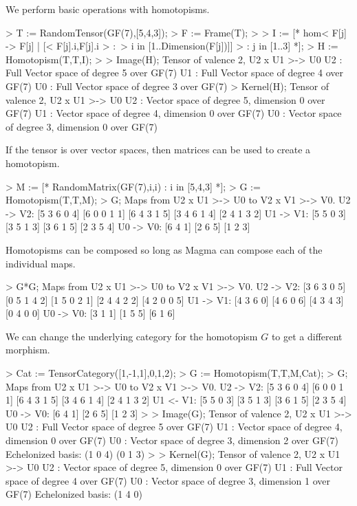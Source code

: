 \begin{example}
We perform basic operations with homotopisms.

\begin{code}
> T := RandomTensor(GF(7),[5,4,3]);
> F := Frame(T);
> 
> I := [* hom< F[j] -> F[j] | [< F[j].i,F[j].i > :\
>   i in [1..Dimension(F[j])]] > : j in [1..3] *];
> H := Homotopism(T,T,I);
> 
> Image(H);
Tensor of valence 2, U2 x U1 >-> U0
U2 : Full Vector space of degree 5 over GF(7)
U1 : Full Vector space of degree 4 over GF(7)
U0 : Full Vector space of degree 3 over GF(7)
> Kernel(H);
Tensor of valence 2, U2 x U1 >-> U0
U2 : Vector space of degree 5, dimension 0 over GF(7)
U1 : Vector space of degree 4, dimension 0 over GF(7)
U0 : Vector space of degree 3, dimension 0 over GF(7)
\end{code}

If the tensor is over vector spaces, then matrices can be used to create a homotopism.

\begin{code}
> M := [* RandomMatrix(GF(7),i,i) : i in [5,4,3] *];
> G := Homotopism(T,T,M);
> G;
Maps from U2 x U1 >-> U0 to V2 x V1 >-> V0.
U2 -> V2: 
[5 3 6 0 4]
[6 0 0 1 1]
[6 4 3 1 5]
[3 4 6 1 4]
[2 4 1 3 2]
U1 -> V1: 
[5 5 0 3]
[3 5 1 3]
[3 6 1 5]
[2 3 5 4]
U0 -> V0: 
[6 4 1]
[2 6 5]
[1 2 3]
\end{code}

Homotopisms can be composed so long as Magma can compose each of the individual maps.

\begin{code}
> G*G;
Maps from U2 x U1 >-> U0 to V2 x V1 >-> V0.
U2 -> V2: 
[3 6 3 0 5]
[0 5 1 4 2]
[1 5 0 2 1]
[2 4 4 2 2]
[4 2 0 0 5]
U1 -> V1: 
[4 3 6 0]
[4 6 0 6]
[4 3 4 3]
[0 4 0 0]
U0 -> V0: 
[3 1 1]
[1 5 5]
[6 1 6]
\end{code}

We can change the underlying category for the homotopism $G$ to get a different morphism.

\begin{code}
> Cat := TensorCategory([1,-1,1],{{0},{1},{2}});
> G := Homotopism(T,T,M,Cat);
> G;
Maps from U2 x U1 >-> U0 to V2 x V1 >-> V0.
U2 -> V2: 
[5 3 6 0 4]
[6 0 0 1 1]
[6 4 3 1 5]
[3 4 6 1 4]
[2 4 1 3 2]
U1 <- V1: 
[5 5 0 3]
[3 5 1 3]
[3 6 1 5]
[2 3 5 4]
U0 -> V0: 
[6 4 1]
[2 6 5]
[1 2 3]
> 
> Image(G);
Tensor of valence 2, U2 x U1 >-> U0
U2 : Full Vector space of degree 5 over GF(7)
U1 : Vector space of degree 4, dimension 0 over GF(7)
U0 : Vector space of degree 3, dimension 2 over GF(7)
Echelonized basis:
(1 0 4)
(0 1 3)
> 
> Kernel(G);
Tensor of valence 2, U2 x U1 >-> U0
U2 : Vector space of degree 5, dimension 0 over GF(7)
U1 : Full Vector space of degree 4 over GF(7)
U0 : Vector space of degree 3, dimension 1 over GF(7)
Echelonized basis:
(1 4 0)
\end{code}
\end{example}

